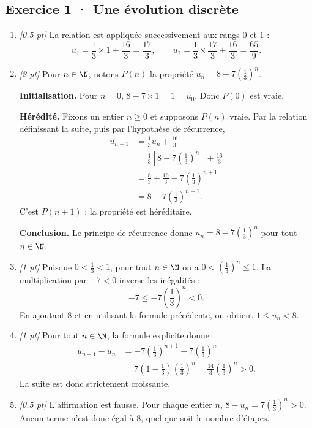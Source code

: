 \subsection*{Exercice 1 · Une évolution discrète}\begin{enumerate}

\item \textit{[\num{0,5} pt]} La relation est appliquée successivement aux rangs $0$ et $1$ :\[u_1=\frac{1}{3}\times 1+\frac{16}{3}=\frac{17}{3},\qquad u_2=\frac{1}{3}\times \frac{17}{3}+\frac{16}{3}=\frac{65}{9}.\]

\item \textit{[2 pt]} Pour $n\in\N$, notons $P(n)$ la propriété $u_n=8-7\left(\frac{1}{3}\right)^n$.
\par\smallskip\textbf{Initialisation.} Pour $n=0$, $8-7\times1=1=u_0$. Donc $P(0)$ est vraie.
\par\smallskip\textbf{Hérédité.} Fixons un entier $n\ge0$ et supposons $P(n)$ vraie. Par la relation définissant la suite, puis par l'hypothèse de récurrence,
\[\begin{aligned}u_{n+1}&=\frac{1}{3}u_n+\frac{16}{3}\\
&=\frac{1}{3}\left[8-7\left(\frac{1}{3}\right)^n\right]+\frac{16}{3}\\
&=\frac{8}{3}+\frac{16}{3}-7\left(\frac{1}{3}\right)^{n+1}\\
&=8-7\left(\frac{1}{3}\right)^{n+1}.
\end{aligned}\]
C'est $P(n+1)$ : la propriété est héréditaire.
\par\smallskip\textbf{Conclusion.} Le principe de récurrence donne $u_n=8-7\left(\frac{1}{3}\right)^n$ pour tout $n\in\N$.

\item \textit{[1 pt]} Puisque $0<\frac{1}{3}<1$, pour tout $n\in\N$ on a $0<(\frac{1}{3})^n\le1$. La multiplication par $-7<0$ inverse les inégalités :
\[-7\le-7(\frac{1}{3})^n<0.\]
En ajoutant $8$ et en utilisant la formule précédente, on obtient $1\le u_n<8$.

\item \textit{[1 pt]} Pour tout $n\in\N$, la formule explicite donne
\[\begin{aligned}u_{n+1}-u_n&=-7(\frac{1}{3})^{n+1}+7(\frac{1}{3})^n\\&=7(1-\frac{1}{3})(\frac{1}{3})^n=\frac{14}{3}(\frac{1}{3})^n>0.\end{aligned}\]
La suite est donc strictement croissante.

\item \textit{[\num{0,5} pt]} L'affirmation est fausse. Pour chaque entier $n$, $8-u_n=7(\frac{1}{3})^n>0$. Aucun terme n'est donc égal à $8$, quel que soit le nombre d'étapes.

\end{enumerate}

